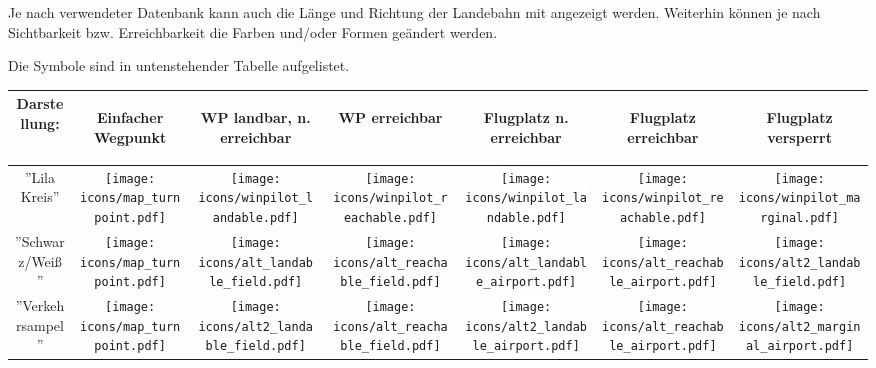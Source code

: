 \tip Je nach verwendeter Datenbank kann auch die Länge und Richtung der Landebahn mit angezeigt werden. 
Weiterhin können je nach Sichtbarkeit bzw. Erreichbarkeit die Farben und/oder Formen geändert werden.

Die Symbole sind in untenstehender Tabelle aufgelistet. 

\begin{tabular}{c|c|cc|ccc|} 
\textbf{Darstellung:} &\begin{sideways}Einfacher Wegpunkt \end{sideways}
&\begin{sideways}WP landbar,  n.  erreichbar\end{sideways}
&\begin{sideways}WP erreichbar\end{sideways}
&\begin{sideways}Flugplatz n. erreichbar\end{sideways}
&\begin{sideways}Flugplatz erreichbar\end{sideways}
&\begin{sideways}Flugplatz versperrt\end{sideways}\\
\hline
''Lila Kreis'' &
\texttt{[image: icons/map\_turnpoint.pdf]} &
\texttt{[image: icons/winpilot\_landable.pdf]} &
\texttt{[image: icons/winpilot\_reachable.pdf]} &
\rule[0em]{0em}{2.5em}\colorbox{white}{\texttt{[image: icons/winpilot\_landable.pdf]}}
& \texttt{[image: icons/winpilot\_reachable.pdf]} 
& \texttt{[image: icons/winpilot\_marginal.pdf]} \\
\hline
''Schwarz/Weiß''  &
\texttt{[image: icons/map\_turnpoint.pdf]} &
\texttt{[image: icons/alt\_landable\_field.pdf]} &
\texttt{[image: icons/alt\_reachable\_field.pdf]} &
\rule[0em]{0em}{2.5em}\colorbox[rgb]{0.94,0.94,0.94}{\texttt{[image: icons/alt\_landable\_airport.pdf]}}
& \texttt{[image: icons/alt\_reachable\_airport.pdf]} 
& \texttt{[image: icons/alt2\_landable\_field.pdf]}\\
\hline
''Verkehrsampel'' &
\texttt{[image: icons/map\_turnpoint.pdf]} &
\texttt{[image: icons/alt2\_landable\_field.pdf]} &
\texttt{[image: icons/alt\_reachable\_field.pdf]} &
\rule[0em]{0em}{2.5em}\colorbox{white}{\texttt{[image: icons/alt2\_landable\_airport.pdf]}}
&\texttt{[image: icons/alt\_reachable\_airport.pdf]} 
&\texttt{[image: icons/alt2\_marginal\_airport.pdf]}\\
\hline
\end{tabular}
%
 
